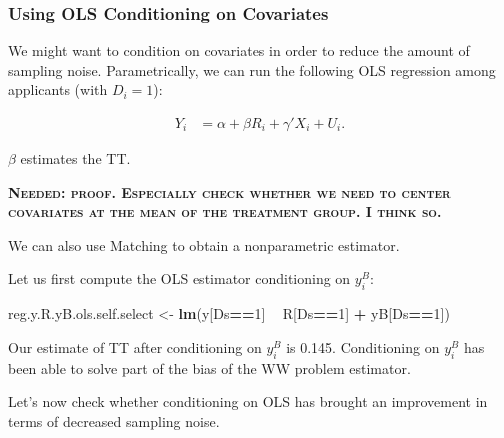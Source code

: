 \documentclass[]{book}
\newenvironment{Shaded}{\begin{snugshade}}{\end{snugshade}}
\newcommand{\DecValTok}[1]{\textcolor[rgb]{0.00,0.00,0.81}{#1}}
\newcommand{\KeywordTok}[1]{\textcolor[rgb]{0.13,0.29,0.53}{\textbf{#1}}}
\newcommand{\NormalTok}[1]{#1}
\newcommand{\OperatorTok}[1]{\textcolor[rgb]{0.81,0.36,0.00}{\textbf{#1}}}
\newcommand{\StringTok}[1]{\textcolor[rgb]{0.31,0.60,0.02}{#1}}
\theoremstyle{definition}
\theoremstyle{definition}
\theoremstyle{definition}
\theoremstyle{remark}
\let\BeginKnitrBlock\begin \let\EndKnitrBlock\end
\begin{document}
\hypertarget{using-ols-conditioning-on-covariates-1}{%
\subsubsection{Using OLS Conditioning on Covariates}\label{using-ols-conditioning-on-covariates-1}}

We might want to condition on covariates in order to reduce the amount of sampling noise.
Parametrically, we can run the following OLS regression among applicants (with \(D_i=1\)):

\begin{align*}
    Y_i &  = \alpha +  \beta R_i + \gamma' X_i + U_i.
\end{align*}

\(\beta\) estimates the TT.

\textbf{\textsc{Needed: proof. Especially check whether we need to center covariates at the mean of the treatment group. I think so.}}

We can also use Matching to obtain a nonparametric estimator.

\BeginKnitrBlock{example}
\protect\hypertarget{exm:unnamed-chunk-85}{}{\label{exm:unnamed-chunk-85} }Let us first compute the OLS estimator conditioning on \(y_i^B\):
\EndKnitrBlock{example}

\begin{Shaded}
\begin{Highlighting}[]
\NormalTok{reg.y.R.yB.ols.self.select <-}\StringTok{ }\KeywordTok{lm}\NormalTok{(y[Ds}\OperatorTok{==}\DecValTok{1}\NormalTok{] }\OperatorTok{~}\StringTok{ }\NormalTok{R[Ds}\OperatorTok{==}\DecValTok{1}\NormalTok{] }\OperatorTok{+}\StringTok{ }\NormalTok{yB[Ds}\OperatorTok{==}\DecValTok{1}\NormalTok{])}
\end{Highlighting}
\end{Shaded}

Our estimate of TT after conditioning on \(y_i^B\) is 0.145.
Conditioning on \(y_i^B\) has been able to solve part of the bias of the WW problem estimator.

Let's now check whether conditioning on OLS has brought an improvement in terms of decreased sampling noise.
\end{document}
